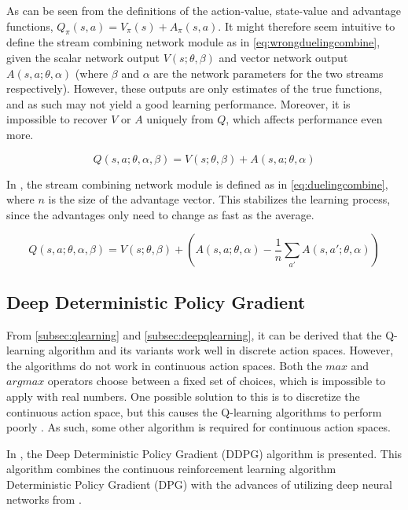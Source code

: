 \documentclass{kththesis}
\begin{document}
As can be seen from the definitions of the action-value, state-value and advantage functions, $Q_\pi(s, a) = V_\pi(s) + A_\pi(s, a)$. It might therefore seem intuitive to define the stream combining network module as in \autoref{eq:wrongduelingcombine}, given the scalar network output $V(s;\theta,\beta)$ and vector network output $A(s, a;\theta, \alpha)$ (where $\beta$ and $\alpha$ are the network parameters for the two streams respectively). However, these outputs are only estimates of the true functions, and as such may not yield a good learning performance. Moreover, it is impossible to recover $V$ or $A$ uniquely from $Q$, which affects performance even more. \parencite{wang2015dueling}

\begin{equation}
\label{eq:wrongduelingcombine}
Q(s,a;\theta,\alpha,\beta) = V(s;\theta,\beta) + A(s, a;\theta, \alpha)
\end{equation}

In \textcite{wang2015dueling}, the stream combining network module is defined as in \autoref{eq:duelingcombine}, where $n$ is the size of the advantage vector. This stabilizes the learning process, since the advantages only need to change as fast as the average. 

\begin{equation}
\label{eq:duelingcombine}
Q(s,a;\theta,\alpha,\beta) = V(s;\theta,\beta) + (A(s, a;\theta, \alpha) - \frac{1}{n}\sum_{a'}A(s, a';\theta, \alpha))
\end{equation}

\subsection{Deep Deterministic Policy Gradient}
From \autoref{subsec:qlearning} and \autoref{subsec:deepqlearning}, it can be derived that the Q-learning algorithm and its variants work well in discrete action spaces. However, the algorithms do not work in continuous action spaces. Both the $max$ and $argmax$ operators choose between a fixed set of choices, which is impossible to apply with real numbers. One possible solution to this is to discretize the continuous action space, but this causes the Q-learning algorithms to perform poorly \parencite{lillicrap2015continuous}. As such, some other algorithm is required for continuous action spaces.

In \textcite{lillicrap2015continuous}, the Deep Deterministic Policy Gradient (DDPG) algorithm is presented. This algorithm combines the continuous reinforcement learning algorithm Deterministic Policy Gradient (DPG) with the advances of utilizing deep neural networks from \textcite{mnih2015human}.
\end{document}
